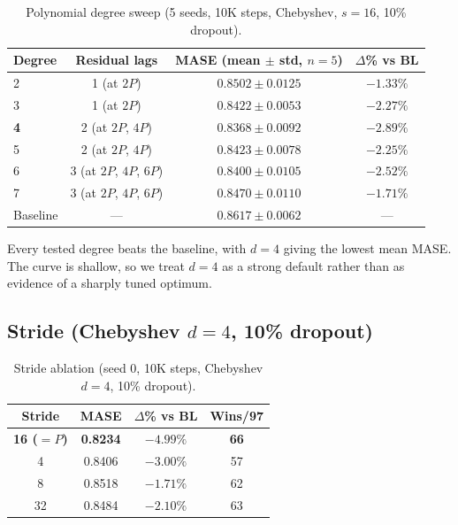 \documentclass{article}
\begin{document}
\begin{table}[H]
\centering
\caption{Polynomial degree sweep (5 seeds, 10K steps, Chebyshev, $s=16$, 10\% dropout).}
\small
\begin{tabular}{lccc}
\toprule
\textbf{Degree} & \textbf{Residual lags} & \textbf{MASE (mean $\pm$ std, $n{=}5$)} & \textbf{$\Delta$\% vs BL} \\
\midrule
2 & 1 (at $2P$) & $0.8502 \pm 0.0125$ & $-1.33\%$ \\
3 & 1 (at $2P$) & $0.8422 \pm 0.0053$ & $-2.27\%$ \\
\textbf{4} & 2 (at $2P$, $4P$) & $\mathbf{0.8368 \pm 0.0092}$ & $\mathbf{-2.89\%}$ \\
5 & 2 (at $2P$, $4P$) & $0.8423 \pm 0.0078$ & $-2.25\%$ \\
6 & 3 (at $2P$, $4P$, $6P$) & $0.8400 \pm 0.0105$ & $-2.52\%$ \\
7 & 3 (at $2P$, $4P$, $6P$) & $0.8470 \pm 0.0110$ & $-1.71\%$ \\
\midrule
Baseline & --- & $0.8617 \pm 0.0062$ & --- \\
\bottomrule
\end{tabular}
\end{table}

Every tested degree beats the baseline, with $d=4$ giving the lowest mean MASE. The curve is shallow, so we treat $d=4$ as a strong default rather than as evidence of a sharply tuned optimum.

\subsection{Stride (Chebyshev $d=4$, 10\% dropout)}

\begin{table}[H]
\centering
\caption{Stride ablation (seed 0, 10K steps, Chebyshev $d=4$, 10\% dropout).}
\small
\begin{tabular}{cccc}
\toprule
\textbf{Stride} & \textbf{MASE} & \textbf{$\Delta$\% vs BL} & \textbf{Wins/97} \\
\midrule
\textbf{16 ($=P$)} & \textbf{0.8234} & $\mathbf{-4.99\%}$ & \textbf{66} \\
4 & 0.8406 & $-3.00\%$ & 57 \\
8 & 0.8518 & $-1.71\%$ & 62 \\
32 & 0.8484 & $-2.10\%$ & 63 \\
\bottomrule
\end{tabular}
\end{table}
\end{document}
